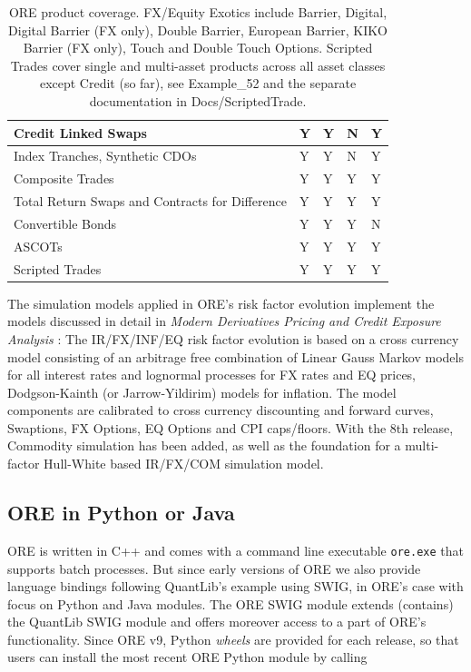 \documentclass[12pt, a4paper]{article}
\begin{document}
\begin{table}[hbt]
\begin{center}
\begin{tabular}{|l|p{1.5cm}|p{1.5cm}|p{1.2cm}|p{1.5cm}|}
\hline
Credit Linked Swaps & Y & Y & N & Y \\
\hline
Index Tranches, Synthetic CDOs & Y & Y & N & Y \\
\hline
Composite Trades & Y & Y & Y & Y \\
\hline
Total Return Swaps and Contracts for Difference & Y & Y & Y & Y \\
\hline
Convertible Bonds & Y & Y & Y & N \\
\hline
ASCOTs & Y & Y & Y & Y \\
\hline
Scripted Trades & Y & Y & Y & Y \\
\hline
\end{tabular}
\caption{ORE product coverage. FX/Equity Exotics include Barrier, Digital, Digital Barrier (FX only), Double Barrier, European Barrier, KIKO Barrier (FX only), Touch and Double Touch Options. Scripted Trades cover single and multi-asset products across all asset classes except Credit (so far), see Example\_52 and the separate documentation in Docs/ScriptedTrade.}
\label{tab_coverage}
\end{center}
\end{table}

\medskip The simulation models applied in ORE's risk factor evolution implement the models discussed in detail in {\em
  Modern Derivatives Pricing and Credit Exposure Analysis} \cite{Lichters}: The IR/FX/INF/EQ risk factor evolution is based on
a cross currency model consisting of an arbitrage free combination of Linear Gauss Markov models for all interest rates
and lognormal processes for FX rates and EQ prices, Dodgson-Kainth (or Jarrow-Yildirim) models for inflation. The model components are calibrated to cross currency discounting and forward curves, Swaptions, FX Options, EQ Options and CPI caps/floors. With the 8th release, Commodity simulation has been added, as well as the foundation for a multi-factor Hull-White based IR/FX/COM simulation model. 

\subsection{ORE in Python or Java}

ORE is written in C++ and comes with a command line executable {\tt ore.exe} that supports batch processes. 
But since early versions of ORE we also provide language bindings following QuantLib's example using SWIG, in ORE's case with focus on Python and Java modules. 
The ORE SWIG module extends (contains) the QuantLib SWIG module and offers moreover access to a part of ORE's functionality.
Since ORE v9, Python {\em wheels} are provided for each release, so that users can install the most recent ORE Python module by calling
\end{document}
